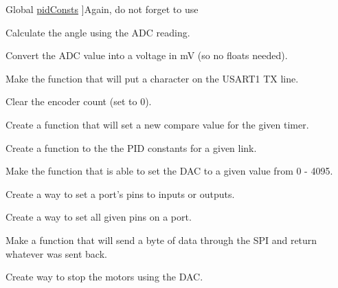 \begin{DoxyRefList}
Global \hyperlink{_p_i_d_8h_a4d2fc78b5924045bcc0e20fc95e18d97}{pid\-Consts} ]Again, do not forget to use 
\item[\label{todo__todo000022}%
\hypertarget{todo__todo000022}{}%
Global \hyperlink{pot_8h_a6572afa21880ee8fe8e834b7167e111b}{pot\-Angle} (int pot)]Calculate the angle using the A\-D\-C reading.  
\item[\label{todo__todo000023}%
\hypertarget{todo__todo000023}{}%
Global \hyperlink{pot_8h_ac8f71572a099805fc4cfcc793260e98b}{pot\-Volts} (int pot)]Convert the A\-D\-C value into a voltage in m\-V (so no floats needed).  
\item[\label{todo__todo000029}%
\hypertarget{todo__todo000029}{}%
Global \hyperlink{_u_s_a_r_t_debug_8h_ab52220b9802762326175f5a6d09c50a1}{put\-Char\-Debug} (char byte\-To\-Send)]Make the function that will put a character on the U\-S\-A\-R\-T1 T\-X line.  
\item[\label{todo__todo000014}%
\hypertarget{todo__todo000014}{}%
Global \hyperlink{_periph_8h_a9b159db17b7ebf680a2bdd169e269f85}{reset\-Enc\-Count} (int chan)]Clear the encoder count (set to 0).  
\item[\label{todo__todo000027}%
\hypertarget{todo__todo000027}{}%
Global \hyperlink{timer_8h_a7641a7bb79d647d59112ed4d20e01aeb}{set\-Comp\-Value} (unsigned char timer, unsigned short int comp)]Create a function that will set a new compare value for the given timer.  
\item[\label{todo__todo000017}%
\hypertarget{todo__todo000017}{}%
Global \hyperlink{_p_i_d_8h_a2ffb511c1e18ce767f42422609dfa04d}{set\-Const} (char link, float Kp, float Ki, float Kd)]Create a function to the the P\-I\-D constants for a given link.  
\item[\label{todo__todo000005}%
\hypertarget{todo__todo000005}{}%
Global \hyperlink{_d_a_c_8h_af5aa1a81aa11a072a5ab582d040b3edf}{set\-D\-A\-C} (int D\-A\-Cn, int S\-P\-I\-Val)]Make the function that is able to set the D\-A\-C to a given value from 0 -\/ 4095.  
\item[\label{todo__todo000019}%
\hypertarget{todo__todo000019}{}%
Global \hyperlink{ports_8h_a1b62a36451c75cf20221c12f039ad6f4}{set\-Pins\-Dir} (char port, int dir, char num\-Pins,...)]Create a way to set a port's pins to inputs or outputs.  
\item[\label{todo__todo000021}%
\hypertarget{todo__todo000021}{}%
Global \hyperlink{ports_8h_afd809b04181b31d8567d95f070bb9034}{set\-Pins\-Val} (char port, int val, int num\-Pins,...)]Create a way to set all given pins on a port.  
\item[\label{todo__todo000025}%
\hypertarget{todo__todo000025}{}%
Global \hyperlink{_s_p_i_8h_a4d2cd713b65091a59a9a2ee50b28bdf1}{spi\-Transceive} (B\-Y\-T\-E data)]Make a function that will send a byte of data through the S\-P\-I and return whatever was sent back.  
\item[\label{todo__todo000006}%
\hypertarget{todo__todo000006}{}%
Global \hyperlink{motors_8h_a5260da8b51f5d97f6cf2a9ba11d1aee1}{stop\-Motors} ()]Create way to stop the motors using the D\-A\-C. 
\end{DoxyRefList}